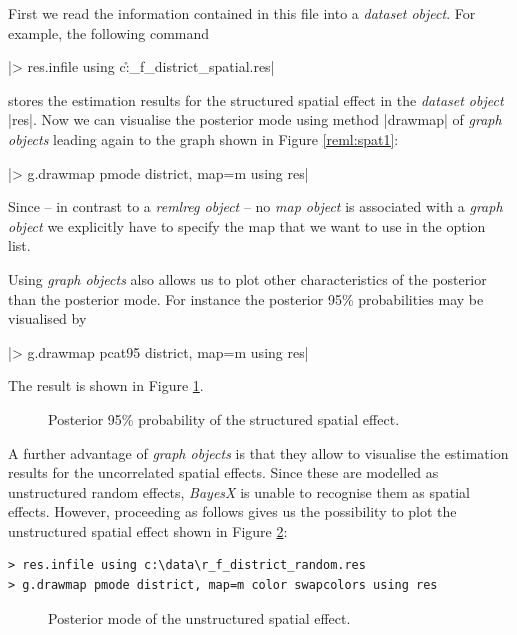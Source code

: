 First we read the information contained in this file into a {\it dataset object}. For example, the following command

|> res.infile using c:\data\r_f_district_spatial.res|

stores the estimation results for the structured spatial effect in the {\it dataset object} |res|. Now we can visualise the
posterior mode using method |drawmap| of {\it graph objects} leading again to the graph shown in Figure \ref{reml:spat1}:

|> g.drawmap pmode district, map=m using res|

Since -- in contrast to a {\it remlreg object} -- no {\it map object} is associated with a {\it graph object} we explicitly
have to specify the map that we want to use in the option list.

Using {\it graph objects} also allows us to plot other characteristics of the posterior than the posterior mode. For instance
the posterior 95\% probabilities may be visualised by

|> g.drawmap pcat95 district, map=m using res|

The result is shown in Figure \ref{reml:spat2}.

\begin{figure}[ht]
\begin{center}
{\it\caption{Posterior 95\% probability of the structured spatial
effect.\label{reml:spat2}}}
\end{center}
\end{figure}

A further advantage of {\it graph objects} is that they allow to visualise the estimation results for the uncorrelated spatial
effects. Since these are modelled as unstructured random effects, {\it BayesX} is unable to recognise them as spatial effects.
However, proceeding as follows gives us the possibility to plot the unstructured spatial effect shown in Figure
\ref{reml:random1}:

\begin{verbatim}
> res.infile using c:\data\r_f_district_random.res
> g.drawmap pmode district, map=m color swapcolors using res
\end{verbatim}

\begin{figure}[ht]
\begin{center}
{\it\caption{Posterior mode of the unstructured spatial
effect.\label{reml:random1}}}
\end{center}
\end{figure}

